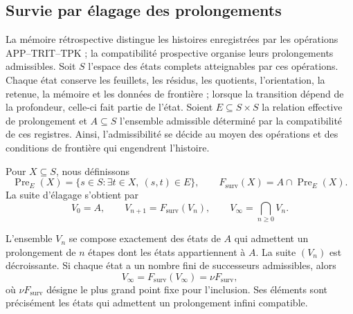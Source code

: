 \subsection{Survie par élagage des prolongements}
\label{corpus9:xi:supervivencia}

La mémoire rétrospective distingue les histoires enregistrées par les
opérations APP--TRIT--TPK ; la compatibilité prospective organise leurs
prolongements admissibles. Soit \(S\) l’espace des états complets
atteignables par ces opérations. Chaque état conserve les feuillets, les résidus,
les quotients, l’orientation, la retenue, la mémoire et les données de frontière ; lorsque la
transition dépend de la profondeur, celle-ci fait partie de l’état.
Soient \(E\subseteq S\times S\) la relation effective de prolongement et
\(A\subseteq S\) l’ensemble admissible déterminé par la compatibilité de
ces registres. Ainsi, l’admissibilité se décide au moyen des opérations et
des conditions de frontière qui engendrent l’histoire.

Pour \(X\subseteq S\), nous définissons
\begin{equation}
 \operatorname{Pre}_{E}(X)
 =\{s\in S:\exists t\in X,\ (s,t)\in E\},
 \qquad
 F_{\mathrm{surv}}(X)=A\cap\operatorname{Pre}_{E}(X).
 \label{corpus9:xi:operador-poda}
\end{equation}
La suite d’élagage s’obtient par
\begin{equation}
 V_0=A,\qquad
 V_{n+1}=F_{\mathrm{surv}}(V_n),\qquad
 V_\infty=\bigcap_{n\geq0}V_n.
 \label{corpus9:xi:sucesion-poda}
\end{equation}

\begin{proposition}
\label{corpus9:xi:mayor-punto-fijo}
L’ensemble \(V_n\) se compose exactement des états de \(A\) qui admettent
un prolongement de \(n\) étapes dont les états appartiennent à \(A\). La
suite \((V_n)\) est décroissante. Si chaque état a un nombre fini
de successeurs admissibles, alors
\[
 V_\infty=F_{\mathrm{surv}}(V_\infty)
          =\nu F_{\mathrm{surv}},
\]
où \(\nu F_{\mathrm{surv}}\) désigne le plus grand point fixe pour l’inclusion.
Ses éléments sont précisément les états qui admettent un prolongement
infini compatible.
\end{proposition}

